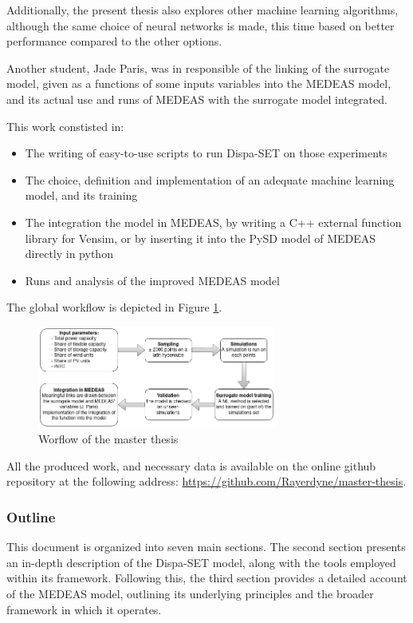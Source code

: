 Additionally, the present thesis also explores other machine learning algorithms, although the same choice of neural networks is made, this time based on better performance compared to the other options.

Another student, Jade Paris, was in responsible of the linking of the surrogate model, given as a functions of some inputs variables into the MEDEAS model, and its actual use and runs of MEDEAS with the surrogate model integrated.

This work constisted in:
\begin{itemize}
    \item The writing of easy-to-use scripts to run Dispa-SET on those experiments
    \item The choice, definition and implementation of an adequate machine learning model, and its training
    \item The integration the model in MEDEAS, by writing a C++ external function library for Vensim, or by inserting it into the PySD model of MEDEAS directly in python
    \item Runs and analysis of the improved MEDEAS model
\end{itemize}

The global workflow is depicted in Figure \ref{fig:thesis-workflow}.

\begin{figure}[h]
    \centering
    \includegraphics[width=0.7\textwidth]{resources/images/workflow.png}
    \caption{Worflow of the master thesis}
    \label{fig:thesis-workflow}
\end{figure}

All the produced work, and necessary data is available on the online github repository at the following address: \href{https://github.com/Rayerdyne/master-thesis}{https://github.com/Rayerdyne/master-thesis}.

\subsubsection{Outline}

This document is organized into seven main sections. The second section presents an in-depth description of the Dispa-SET model, along with the tools employed within its framework. Following this, the third section provides a detailed account of the MEDEAS model, outlining its underlying principles and the broader framework in which it operates.

